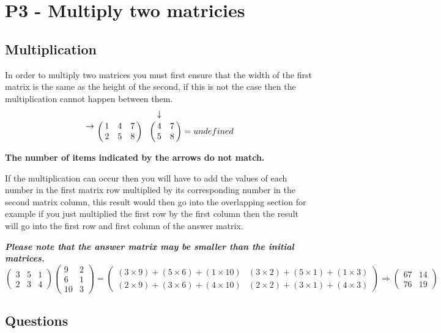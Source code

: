 \documentclass{article}
\begin{document}
\section{P3 - Multiply two matricies}
\subsection{Multiplication}

In order to multiply two matrices you must first ensure that the width of the first matrix is the same as the height of the second, if this is not the case then the multiplication cannot happen between them.
\[
\bordermatrix{~ & ~ & ~ & ~ \cr \rightarrow & 1 & 4 & 7 \cr ~ & 2 & 5 & 8 \cr}
\bordermatrix{~ & \downarrow & ~ \cr ~ & 4 & 7 \cr ~ & 5 & 8}
= undefined
\]
\begin{center} \small{ \textbf{The number of items indicated by the arrows do not match.\\}} \end{center}
If the multiplication can occur then you will have to add the values of each number in the first matrix row multiplied by its corresponding number in the second matrix column, this result would then go into the overlapping section for example if you just multiplied the first row by the first column then the result will go into the first row and first column of the answer matrix.

\textit{\textbf{Please note that the answer matrix may be smaller than the initial matrices.}}
\begin{equation*}
	\begin{pmatrix}
		3 & 5 & 1\\
		2 & 3 & 4
	\end{pmatrix}
	\begin{pmatrix}
		9 & 2\\
		6 & 1\\
		10 & 3
	\end{pmatrix}
	=
	\begin{pmatrix}
		(3\times9)+(5\times6)+(1\times10) & (3\times2)+(5\times1)+(1\times3)\\
		(2\times9)+(3\times6)+(4\times10) & (2\times2)+(3\times1)+(4\times3)
	\end{pmatrix}
	\Rightarrow
	\begin{pmatrix}
		67 & 14\\
		76 & 19
	\end{pmatrix}
\end{equation*}
\subsection{Questions}
\end{document}
